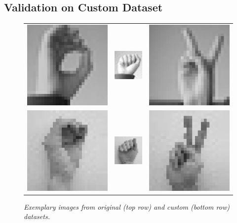 \documentclass[a4paper]{article}
\begin{document}
\subsection{Validation on Custom Dataset}
\begin{figure}[t]
     \centering
     \begin{tabular}{ccc}
          \includegraphics[width=.25\linewidth]{graphics/custom_dataset/orig0}&\includegraphics[width=.25\linewidth]{graphics/custom_dataset/orig1}&\includegraphics[width=.25\linewidth]{graphics/custom_dataset/orig2} \\
          \includegraphics[width=.25\linewidth]{graphics/custom_dataset/custom0}&\includegraphics[width=.25\linewidth]{graphics/custom_dataset/custom1}&\includegraphics[width=.25\linewidth]{graphics/custom_dataset/custom2}
     \end{tabular}
     \caption{\textit{Exemplary images from original (top row) and custom (bottom row) datasets.}}
     \label{fig:custom_dataset} 
\end{figure}
\end{document}
